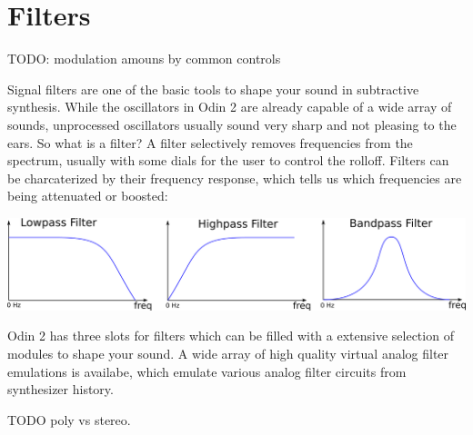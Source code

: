 \chapter{Filters}

TODO: modulation amouns by common controls

\label{filters}
Signal filters are one of the basic tools to shape your sound in subtractive synthesis. While the oscillators in Odin 2 are already capable of a wide array of sounds, unprocessed oscillators usually sound very sharp and not pleasing to the ears. So what is a filter? A filter selectively removes frequencies from the spectrum, usually with some dials for the user to control the rolloff. Filters can be charcaterized by their frequency response, which tells us which frequencies are being attenuated or boosted:

\vspace{5mm}
\begin{center}
    \includegraphics[width=\textwidth]{graphics/filter.png}
\end{center}

\vspace{5mm}

Odin 2 has three slots for filters which can be filled with a extensive selection of modules to shape your sound. A wide array of high quality virtual analog filter emulations is availabe, which emulate various analog filter circuits from synthesizer history.

TODO poly vs stereo.


